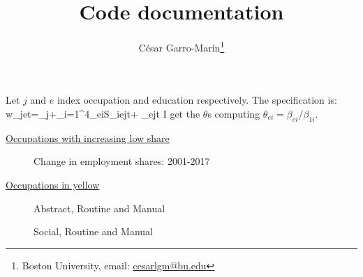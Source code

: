 \documentclass[a4paper, 12pt]{article}
\title{Code documentation}
\author{C\'esar Garro-Mar\'in\thanks{Boston University, email: \href{mailto:cesarlgm@bu.edu}{cesarlgm@bu.edu}}}
\begin{document}
\maketitle

\newcommand{\ntimes}{4 }

Let $j$ and $e$ index occupation and education respectively. The specification is:
\beqns
	\Delta \ln w_{jet}=\lambda_j+\sum_{i=1}^{4}\beta_{ei}S_{iejt}+ \varepsilon_{ejt}
\eeqns
I get the $\theta$s computing $\theta_{ei}=\beta_{ei}/\beta_{1i}$.
{\tiny }
{\tiny }

\href{https://www.dropbox.com/s/dnt84rs90zac1h9/t_stats.txt?dl=0}{Occupations with increasing low share}







\begin{figure}
	\caption{Change in employment shares: 2001-2017}
\end{figure}

\FloatBarrier
\href{https://www.dropbox.com/s/pxkgmtnkhq6c0j1/deskilling_occupations.txt?dl=0}{Occupations in yellow}
\begin{figure}
\caption{Abstract, Routine and Manual}
\end{figure}
\begin{figure}
\ContinuedFloat
{}
\end{figure}
\begin{figure}
\ContinuedFloat
{}
\end{figure}

\begin{figure}
	\caption{Social, Routine and Manual}
\end{figure}
\begin{figure}
	\ContinuedFloat
\end{figure}
\begin{figure}
	\ContinuedFloat
\end{figure}
\end{document}
